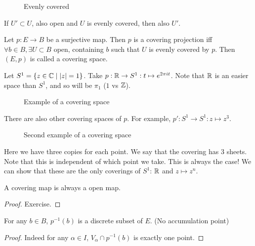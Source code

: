 \begin{figure}[ht]
    \centering
    \caption{Evenly covered}
    \label{fig:evenly-covered}
\end{figure}

\begin{remark}
    If $U' \subset U$, also open and $U$ is evenly covered, then also $U'$.
\end{remark}
\begin{definition}
    Let $p: E \to  B$ be a surjective map.
    Then $p$ is a covering projection iff $\forall b \in B, \exists  U \subset B$ open, containing $b$ such that $U$ is evenly covered by $p$. 
    Then $(E, p)$ is called a covering space.
\end{definition}
\begin{eg}
    Let $S^{1} = \{ z \in \mathbb{C}  \mid  |z| = 1\}$.
    Take $p: \mathbb{R} \to  S^{1}: t \mapsto  e^{2 \pi i t}$.
    Note that $\mathbb{R}$ is an easier space than $S^{1}$, and so will be $\pi_1$ ($1$ vs  $\mathbb{Z}$).
    \begin{figure}[H]
        \centering
        \caption{Example of a covering space}
        \label{fig:covering-space-example}
    \end{figure}
    There are also other covering spaces of $p$.
    For example, $p' : S^{1} \to  S^{1} : z \mapsto z^3$.
    \begin{figure}[H]
        \centering
        \caption{Second example of a covering space}
        \label{fig:covering-space-example-2}
    \end{figure}
    Here we have three copies for each point. We say that the covering has $3$ sheets.
    Note that this is independent of which point we take. This is always the case!
    We can show that these are the only coverings of $S^{1}$: $\mathbb{R}$ and  $z \mapsto  z^{n}$.
\end{eg}

\begin{prop}
    A covering map is always a open map.
\end{prop}
\begin{proof}
    Exercise.
\end{proof}
\begin{prop}
    For any $b \in B$, $p^{-1}(b)$ is a discrete subset of $E$. (No accumulation point)
\end{prop}
\begin{proof}
    Indeed for any $\alpha \in I$, $V_\alpha \cap p^{-1}(b)$ is exactly one point.
\end{proof}

